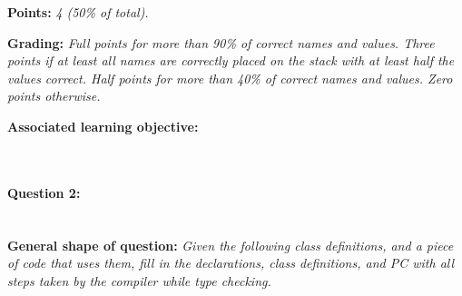 {
}

\textbf{Points:} \textit{4 (50\% of total).}

\textbf{Grading:} \textit{Full points for more than 90\% of correct names and values. Three points if at least all names are correctly placed on the stack with at least half the values correct. Half points for more than 40\% of correct names and values. Zero points otherwise.}

\textbf{Associated learning objective:} 

\ \\ 

\paragraph{Question 2: } \ \\

\textbf{General shape of question:} \textit{Given the following class definitions, and a piece of code that uses them, fill in the declarations, class definitions, and PC with all steps taken by the compiler while type checking.}

